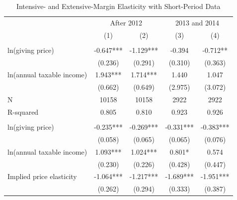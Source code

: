 \documentclass[ review  , 3p ]{elsarticle}
\begin{document}
  \begin{table}

  \caption{\label{tab:kableShortElasticity2}Intensive- and Extensive-Margin Elasticity with Short-Period Data}
  \centering
  \fontsize{7}{9}\selectfont
  \begin{threeparttable}
  \begin{tabular}[t]{lcccc}
  \toprule
  \multicolumn{1}{c}{ } & \multicolumn{2}{c}{After 2012} & \multicolumn{2}{c}{2013 and 2014} \\
  \cmidrule(l{3pt}r{3pt}){2-3} \cmidrule(l{3pt}r{3pt}){4-5}
   & (1) & (2) & (3) & (4)\\
  \midrule
  \addlinespace[0.3em]
  \multicolumn{5}{l}{\textbf{Intensive-Margin Elasticity}}\\
  \hspace{1em}ln(giving price) & -0.647*** & -1.129*** & -0.394 & -0.712**\\
  \hspace{1em} & (0.236) & (0.291) & (0.310) & (0.363)\\
  \hspace{1em}ln(annual taxable income) & 1.943*** & 1.714*** & 1.440 & 1.047\\
  \hspace{1em} & (0.662) & (0.649) & (2.975) & (3.072)\\
  \hspace{1em}N & 10158 & 10158 & 2922 & 2922\\
  \hspace{1em}R-squared & 0.805 & 0.810 & 0.923 & 0.926\\
  \addlinespace[0.3em]
  \multicolumn{5}{l}{\textbf{Extensive-Margin Elasticity}}\\
  \hspace{1em}ln(giving price) & -0.235*** & -0.269*** & -0.331*** & -0.383***\\
  \hspace{1em} & (0.058) & (0.065) & (0.065) & (0.076)\\
  \hspace{1em}ln(annual taxable income) & 1.093*** & 1.024*** & 0.801* & 0.574\\
  \hspace{1em} & (0.230) & (0.226) & (0.428) & (0.447)\\
  \hspace{1em}Implied price elasticity & -1.064*** & -1.217*** & -1.689*** & -1.951***\\
  \hspace{1em} & (0.262) & (0.294) & (0.333) & (0.387)\\

\end{tabular}
\end{threeparttable}
\end{table}
\end{document}
